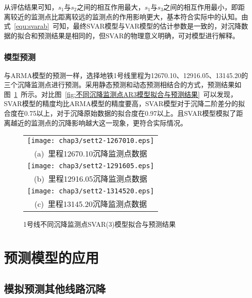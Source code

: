 从评估结果可知，$s_1$与$s_2$之间的相互作用最大，$s_1$与$s_3$之间的相互作用最小，即距离较近的监测点比距离较远的监测点的作用影响更大，基本符合实际中的认知。由式~\ref{equ:svarab}~可知，最终SVAR模型与VAR模型的估计参数是一致的，对沉降数据的拟合和预测结果是相同的，但SVAR的物理意义明确，可对模型进行解释。

\subsubsection{模型预测}

与ARMA模型的预测一样，选择地铁1号线里程为12670.10、12916.05、13145.20的三个沉降监测点进行预测。采用静态预测和动态预测相结合的方式，预测结果如图~\ref{fig:不同沉降监测点SVAR3模型拟合与预测结果}~所示。对比图~\ref{fig:不同沉降监测点AR3模型拟合与预测结果}~可以发现，SVAR模型的精度均比ARMA模型的精度要高，SVAR模型对于沉降二阶差分的拟合度在0.75以上，对于沉降原始数据的拟合度在0.97以上。且SVAR模型模拟了距离越近的监测点的沉降影响越大这一现象，更符合实际情况。

\begin{figure}[htbp] 
    \centering 
    \begin{tabular}{c} 
        \texttt{[image: chap3/sett2-1267010.eps]} \\ 
        (a)~里程12670.10沉降监测点数据 \\
        \texttt{[image: chap3/sett2-1291605.eps]} \\ 
        (b)~里程12916.05沉降监测点数据 \\
        \texttt{[image: chap3/sett2-1314520.eps]} \\ 
        (c)~里程13145.20沉降监测点数据 \\
    \end{tabular}
    \caption{1号线不同沉降监测点SVAR(3)模型拟合与预测结果} 
    \label{fig:不同沉降监测点SVAR3模型拟合与预测结果} 
\end{figure}

\section{预测模型的应用}

\subsection{模拟预测其他线路沉降}

